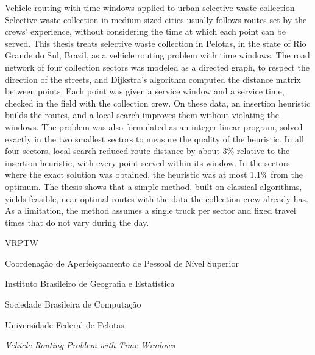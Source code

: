 \documentclass[tese,capa]{texufpel}
\begin{document}
\begin{englishabstract}{Vehicle routing with time windows applied to urban selective waste collection}
Selective waste collection in medium-sized cities usually follows routes set
by the crews' experience, without considering the time at which each point
can be served. This thesis treats selective waste collection in Pelotas, in
the state of Rio Grande do Sul, Brazil, as a vehicle routing problem with
time windows. The road network of four collection sectors was modeled as a
directed graph, to respect the direction of the streets, and Dijkstra's
algorithm computed the distance matrix between points. Each point was given a
service window and a service time, checked in the field with the collection
crew. On these data, an insertion heuristic builds the routes, and a local
search improves them without violating the windows. The problem was also
formulated as an integer linear program, solved exactly in the two smallest
sectors to measure the quality of the heuristic. In all four sectors, local
search reduced route distance by about 3\% relative to the insertion
heuristic, with every point served within its window. In the sectors where
the exact solution was obtained, the heuristic was at most 1.1\% from the
optimum. The thesis shows that a simple method, built on classical
algorithms, yields feasible, near-optimal routes with the data the collection
crew already has. As a limitation, the method assumes a single truck per
sector and fixed travel times that do not vary during the day.
\end{englishabstract}

\listoffigures
\listofquadros   %
\listoftables

\begin{listofabbrv}{VRPTW}
  \item[CAPES] Coordenação de Aperfeiçoamento de Pessoal de Nível Superior
  \item[IBGE]  Instituto Brasileiro de Geografia e Estatística
  \item[SBC]   Sociedade Brasileira de Computação
  \item[UFPel] Universidade Federal de Pelotas
  \item[VRPTW] \textit{Vehicle Routing Problem with Time Windows}
\end{listofabbrv}
\end{document}
